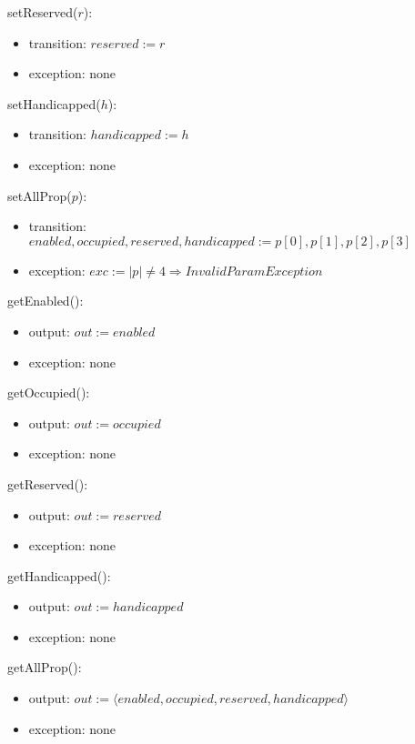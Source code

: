 \documentclass[12pt, titlepage]{article}
\begin{document}
\noindent setReserved($r$):
\begin{itemize} 
\item transition: $reserved := r$
\item exception: none
\end{itemize}

\noindent setHandicapped($h$):
\begin{itemize} 
\item transition: $handicapped := h$
\item exception: none
\end{itemize}

\noindent setAllProp($p$):
\begin{itemize} 
\item transition: $enabled, occupied, reserved, handicapped := p[0], p[1], p[2],
p[3]$
\item exception: $exc := |p| \neq 4 \Rightarrow InvalidParamException$
\end{itemize}

\noindent getEnabled():
\begin{itemize} 
\item output: $out := enabled$
\item exception: none
\end{itemize}

\noindent getOccupied():
\begin{itemize} 
\item output: $out := occupied$
\item exception: none
\end{itemize}

\noindent getReserved():
\begin{itemize} 
\item output: $out := reserved$
\item exception: none
\end{itemize}

\noindent getHandicapped():
\begin{itemize} 
\item output: $out := handicapped$
\item exception: none
\end{itemize}

\noindent getAllProp():
\begin{itemize} 
\item output: $out := \langle enabled, occupied, reserved, handicapped \rangle$
\item exception: none
\end{itemize}
\end{document}

